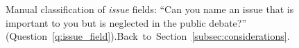 \begin{figure}[h!]
    \caption[Manual classification of \textit{issue} fields]{Manual classification of \textit{issue} fields: ``Can you name an issue that is important to you but is neglected in the public debate?'' (Question~\ref{q:issue_field}).\hfill Back~to~Section~\ref{subsec:considerations}.
    }\label{fig:issue_field}
\end{figure}


